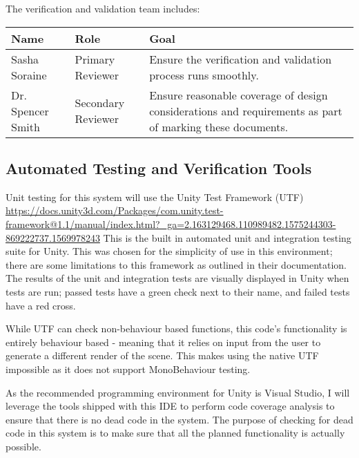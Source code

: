 \documentclass[12pt, titlepage]{article}
\begin{document}
The verification and validation team includes:

\begin{table}[h]
	\begin{tabular}{|l|l|p{8cm}|}
		\hline
		\textbf{Name} & \textbf{Role} & \textbf{Goal} \\
		\hline
		Sasha Soraine & Primary Reviewer& Ensure the verification and 
		validation process runs smoothly.\\
		Dr. Spencer Smith & Secondary Reviewer& Ensure reasonable coverage of 
		design considerations and requirements as part of marking these 
		documents. \\
		\hline
	\end{tabular}
\end{table}

\subsection{Automated Testing and Verification Tools}\label{testingTools}
Unit testing for this system will use the Unity Test Framework (UTF) 
\url{https://docs.unity3d.com/Packages/com.unity.test-framework@1.1/manual/index.html?_ga=2.163129468.110989482.1575244303-869222737.1569978243}
This is the built in automated unit and integration testing suite for Unity. 
This was chosen for the simplicity of use in this environment; there are some 
limitations to this framework as outlined in their documentation. The results 
of the unit and integration tests are visually displayed in Unity when tests 
are run; passed tests have a green check next to their name, and failed tests 
have a red cross.

While UTF can check non-behaviour based functions, this code's functionality is 
entirely behaviour based - meaning that it relies on input from the user to 
generate a different render of the scene. This makes using the native UTF 
impossible as it does not support MonoBehaviour testing.

As the recommended programming environment for Unity is Visual Studio, I will 
leverage the tools shipped with this IDE to perform code coverage analysis to 
ensure that there is no dead code in the system. The purpose of checking for 
dead code in this system is to make sure that all the planned functionality is 
actually possible.

\end{document}
